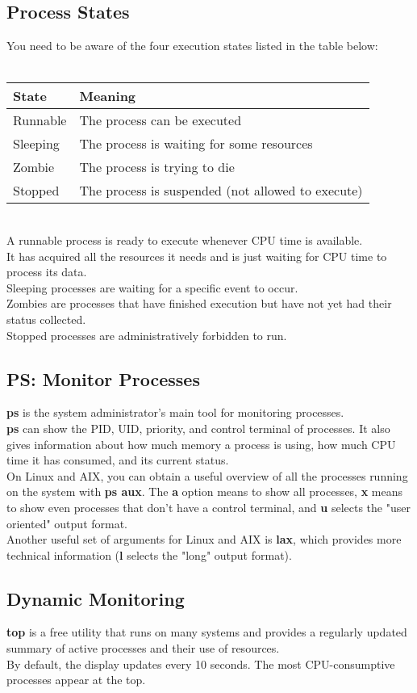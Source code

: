 \documentclass[10pt,letterpaper]{book}
\begin{document}
\subsection{Process States}
You need to be aware of the four execution states listed in the table below:\\
\\
\begin{tabular}{l l}
\hline
\textbf{State} & \textbf{Meaning}\\
\hline 
Runnable & The process can be executed\\
Sleeping & The process is waiting for some resources\\
Zombie & The process is trying to die\\
Stopped & The process is suspended (not allowed to execute)\\
\hline
\end{tabular}
\\
A runnable process is ready to execute whenever CPU time is available.\\
It has acquired all the resources it needs and is just waiting for CPU time to process its data.\\
Sleeping processes are waiting for a specific event to occur.\\
Zombies are processes that have finished execution but have not yet had their
status collected.\\
Stopped processes are administratively forbidden to run.
\subsection{PS: Monitor Processes}
\textbf{ps} is the system administrator's main tool for monitoring processes.\\
\textbf{ps} can show the PID, UID, priority, and control terminal of processes. It also gives information about how much memory a process is using, how much CPU time it has consumed, and its current status.\\
On Linux and AIX, you can obtain a useful overview of all the processes running on the system with \textbf{ps aux}. The \textbf{a} option means to show all processes, \textbf{x} means to show even processes that don't have a control terminal, and \textbf{u} selects the "user oriented" output format.\\
Another useful set of arguments for Linux and AIX is \textbf{lax}, which provides more technical information (\textbf{l} selects the "long" output format).
\subsection{Dynamic Monitoring}
\textbf{top} is a free utility that runs on many systems and provides a regularly updated summary of active processes and their use of resources.\\
By default, the display updates every 10 seconds. The most CPU-consumptive processes appear at the top.
\end{document}
